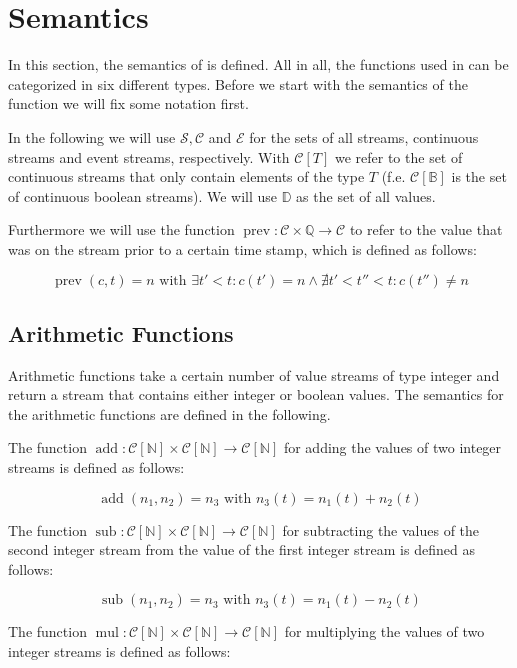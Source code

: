 \section{Semantics}

In this section, the semantics of \tessla is defined. All in all, the functions used in \tessla can be categorized in six different types. Before we start with the semantics of the function we will fix some notation first.

In the following we will use $\mathcal{S},\mathcal{C}$ and $\mathcal{E}$ for the sets of all streams, continuous streams and event streams, respectively. With $\mathcal{C}[T]$ we refer to the set of continuous streams that only contain elements of the type $T$ (f.e. $\mathcal{C}[\mathbb{B}]$ is the set of continuous boolean streams). We will use $\mathbb{D}$ as the set of all values.

Furthermore we will use the function $\operatorname{prev}: \mathcal{C} \times \mathbb{Q} \rightarrow \mathcal{C}$ to refer to the value that was on the stream prior to a certain time stamp, which is defined as follows:

\[\operatorname{prev}(c,t) = n \text{ with } \exists t' < t: c(t') = n \land \nexists t' < t'' < t: c(t'')\not= n \]  

\subsection{Arithmetic Functions}

Arithmetic functions take a certain number of value streams of type integer and return a stream that contains either integer or boolean values. The semantics for the arithmetic functions are defined in the following.

The function $\operatorname{add}: \mathcal{C}[\mathbb{N}] \times \mathcal{C}[\mathbb{N}] \rightarrow \mathcal{C}[\mathbb{N}]$ for adding the values of two integer streams is defined as follows:

\[\operatorname{add}(n_1,n_2) = n_3 \text{ with } n_3(t) = n_1(t) + n_2(t)\]

The function $\operatorname{sub}: \mathcal{C}[\mathbb{N}] \times \mathcal{C}[\mathbb{N}] \rightarrow \mathcal{C}[\mathbb{N}]$ for subtracting the values of the second integer stream from the value of the first integer stream is defined as follows:

\[\operatorname{sub}(n_1,n_2) = n_3 \text{ with } n_3(t) = n_1(t) - n_2(t)\]

The function $\operatorname{mul}: \mathcal{C}[\mathbb{N}] \times \mathcal{C}[\mathbb{N}] \rightarrow \mathcal{C}[\mathbb{N}]$ for multiplying the values of two integer streams is defined as follows:

